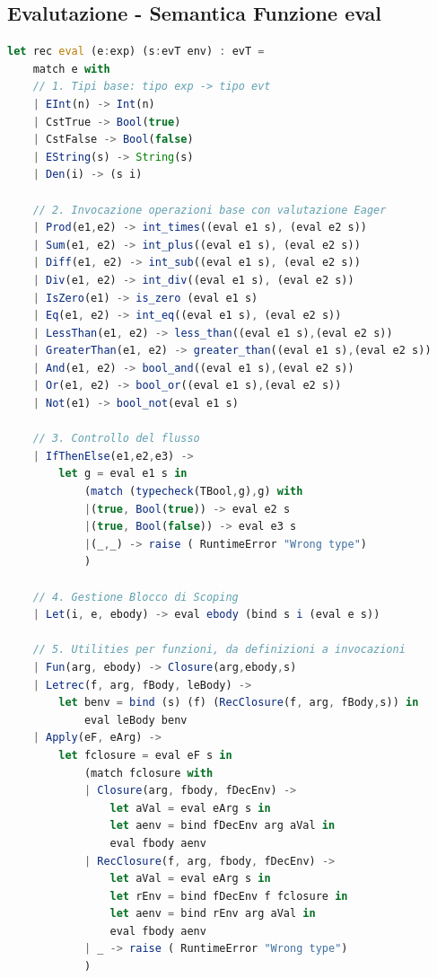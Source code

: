 \documentclass{article}
\begin{document}
\newpage

\subsection{Evalutazione - Semantica Funzione eval}

\begin{lstlisting}[language = JavaScript]
let rec eval (e:exp) (s:evT env) : evT = 
    match e with
    // 1. Tipi base: tipo exp -> tipo evt  
    | EInt(n) -> Int(n)
    | CstTrue -> Bool(true)
    | CstFalse -> Bool(false)
    | EString(s) -> String(s)
    | Den(i) -> (s i)
    
    // 2. Invocazione operazioni base con valutazione Eager 
    | Prod(e1,e2) -> int_times((eval e1 s), (eval e2 s))
    | Sum(e1, e2) -> int_plus((eval e1 s), (eval e2 s))
    | Diff(e1, e2) -> int_sub((eval e1 s), (eval e2 s))
    | Div(e1, e2) -> int_div((eval e1 s), (eval e2 s))
    | IsZero(e1) -> is_zero (eval e1 s)
    | Eq(e1, e2) -> int_eq((eval e1 s), (eval e2 s))
    | LessThan(e1, e2) -> less_than((eval e1 s),(eval e2 s))
    | GreaterThan(e1, e2) -> greater_than((eval e1 s),(eval e2 s))
    | And(e1, e2) -> bool_and((eval e1 s),(eval e2 s))
    | Or(e1, e2) -> bool_or((eval e1 s),(eval e2 s))
    | Not(e1) -> bool_not(eval e1 s)
    
    // 3. Controllo del flusso 
    | IfThenElse(e1,e2,e3) -> 
        let g = eval e1 s in 
            (match (typecheck(TBool,g),g) with
            |(true, Bool(true)) -> eval e2 s
            |(true, Bool(false)) -> eval e3 s
            |(_,_) -> raise ( RuntimeError "Wrong type")
            )

    // 4. Gestione Blocco di Scoping
    | Let(i, e, ebody) -> eval ebody (bind s i (eval e s))

    // 5. Utilities per funzioni, da definizioni a invocazioni
    | Fun(arg, ebody) -> Closure(arg,ebody,s)
    | Letrec(f, arg, fBody, leBody) ->
        let benv = bind (s) (f) (RecClosure(f, arg, fBody,s)) in
            eval leBody benv
    | Apply(eF, eArg) ->
        let fclosure = eval eF s in 
            (match fclosure with 
            | Closure(arg, fbody, fDecEnv) -> 
                let aVal = eval eArg s in 
                let aenv = bind fDecEnv arg aVal in 
                eval fbody aenv 
            | RecClosure(f, arg, fbody, fDecEnv) -> 
                let aVal = eval eArg s in
                let rEnv = bind fDecEnv f fclosure in
                let aenv = bind rEnv arg aVal in 
                eval fbody aenv
            | _ -> raise ( RuntimeError "Wrong type")
            )
\end{lstlisting}
\vspace*{-20px}
\end{document}
